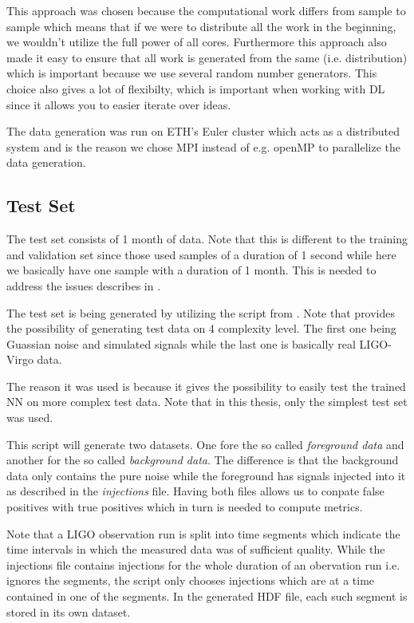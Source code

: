 This approach was chosen because the computational work differs from
sample to sample which means that if we were to distribute all the work in the
beginning, we wouldn't utilize the full power of all cores. Furthermore this
approach also made it easy to ensure that
all work is generated from the same  (i.e. distribution) which is
important because we use several random number generators. This choice
also gives a lot of flexibilty, which is important when working with DL since
it allows you to easier iterate over ideas.

The data generation was run on ETH's Euler cluster which acts as a distributed
system and is the reason we chose MPI instead of e.g. openMP to parallelize the
data generation.

\subsection{Test Set}
The test set consists of 1 month of data. Note that this is different to the
training and validation set since those used samples of a duration of 1 second
while here we basically have one sample with a duration of 1 month. This is
needed to address the issues describes in \cite{PhysRevD.100.063015}.

The test set is being generated by utilizing the  script
from \cite{MLGWSC1}. Note that \cite{MLGWSC1} provides the possibility of
generating test data on 4 complexity level. The first one being Guassian noise
and simulated signals while the last one is basically real LIGO-Virgo data.

The reason it was used is because it gives the possibility to easily test the
trained NN on more complex test data. Note that in this thesis, only the simplest
test set was used.

This script will generate two datasets. One fore the so called
\textit{foreground data} and another for the so called \textit{background data}.
The difference is that the background data only contains the pure noise
while the foreground has signals injected into it as described in the
\textit{injections} file. Having both files allows us to conpate false positives
with true positives which in turn is needed to compute metrics.

Note that a LIGO observation run is split into time segments which indicate
the time intervals in which the measured data was of sufficient quality. While
the injections file contains injections for the whole duration of an
obervation run i.e. ignores the segments, the  script
only chooses injections which are at a time contained in one of the segments. In
the generated HDF file, each such segment is stored in its own dataset.

